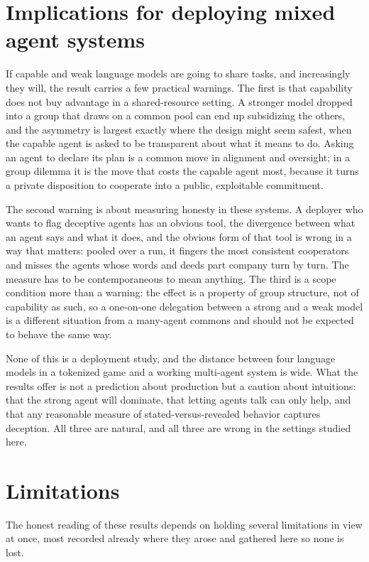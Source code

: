 \section{Implications for deploying mixed agent systems}
\label{sec:disc-implications}

If capable and weak language models are going to share tasks, and increasingly they will, the
result carries a few practical warnings. The first is that capability does not buy advantage in a
shared-resource setting. A stronger model dropped into a group that draws on a common pool can
end up subsidizing the others, and the asymmetry is largest exactly where the design might seem
safest, when the capable agent is asked to be transparent about what it means to do. Asking an
agent to declare its plan is a common move in alignment and oversight; in a group dilemma it is
the move that costs the capable agent most, because it turns a private disposition to cooperate
into a public, exploitable commitment.

The second warning is about measuring honesty in these systems. A deployer who wants to flag
deceptive agents has an obvious tool, the divergence between what an agent says and what it does,
and the obvious form of that tool is wrong in a way that matters: pooled over a run, it fingers
the most consistent cooperators and misses the agents whose words and deeds part company turn by
turn. The measure has to be contemporaneous to mean anything. The third is a scope condition more
than a warning: the effect is a property of group structure, not of capability as such, so a
one-on-one delegation between a strong and a weak model is a different situation from a many-agent
commons and should not be expected to behave the same way.

None of this is a deployment study, and the distance between four language models in a tokenized
game and a working multi-agent system is wide. What the results offer is not a prediction about
production but a caution about intuitions: that the strong agent will dominate, that letting
agents talk can only help, and that any reasonable measure of stated-versus-revealed behavior
captures deception. All three are natural, and all three are wrong in the settings studied here.

\section{Limitations}
\label{sec:disc-limitations}

The honest reading of these results depends on holding several limitations in view at once, most
recorded already where they arose and gathered here so none is lost.

